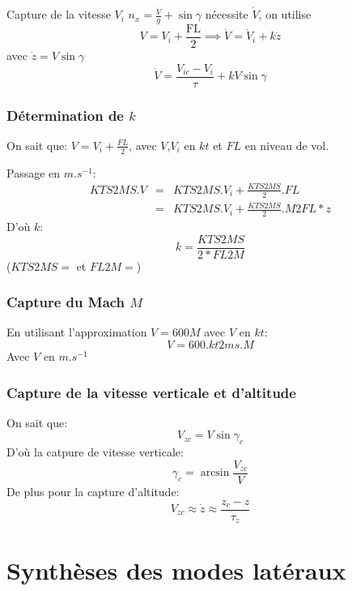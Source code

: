 \documentclass[footheight=2em]{beamer}
\begin{document}
\begin{frame}{Capture de la vitesse \( V_i \)} \pause{}
    \(n_x = \frac{\dot{V}}{g} + \sin \gamma \) \pause{} n\'ecessite \(\dot{V}\),
    on utilise
    \[
    V = V_i + \frac{\text{FL}}{2} \implies \dot{V} = \dot{V}_i + k\dot{z}
    \]
    \pause{}
    avec \( \dot{z} = V\sin \gamma \)
    \[
    \dot{V} = \frac{V_{ic} - V_i}{\tau} + kV\sin \gamma
    \]
\end{frame}

\begin{frame}
    \frametitle{Détermination de \( k \)} \pause{}
    On sait que:
    \(
    V = V_i + \frac{FL}{2}
    \), avec \( V \),\( V_i \) en \( kt \) et \( FL \) en niveau de vol.

    Passage en \( m.s^{-1} \):
    \[
    \begin{array}{rcl}
        KTS2MS . V &=& KTS2MS . V_i + \frac{KTS2MS}{2} . FL\\
        &=& KTS2MS . V_i + \frac{KTS2MS}{2} . M2FL * z
    \end{array}
    \] \pause{}
    D'où \( k \):
    \[
    \boxed{
        k = \frac{KTS2MS}{2*FL2M}
    }
    \]
    (\( KTS2MS = \) et \( FL2M = \))

\end{frame}

\begin{frame}
    \frametitle{Capture du Mach \( M \)} \pause{}
    En utilisant l'approximation \( V = 600 M \) avec \( V \) en \( kt \):
    \[
    \boxed{
        V = 600 . kt2ms . M
    }
    \]
    Avec \( V \) en \( m.s^{-1} \)
\end{frame}

\begin{frame}
    \frametitle{Capture de la vitesse verticale et d'altitude } \pause{}
    On sait que:
    \[
    V_{zc} = V \sin \gamma_{c}
    \] \pause{}
    D'où la catpure de vitesse verticale:
    \[
    \gamma _c = \arcsin \frac{V_{zc}}{V}
    \] \pause{}
    De plus pour la capture d'altitude:
    \[
    V_{zc} \approx \dot{z}  \approx \frac{z_c - z}{\tau_z}
    \]
\end{frame}

\section{Synth\`eses des modes lat\'eraux}
\end{document}
